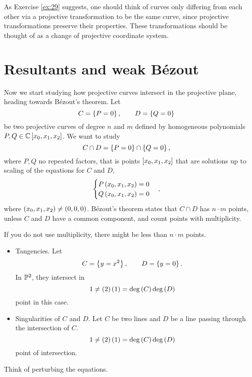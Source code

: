 \begin{remark}
As Exercise \ref{ex:29} suggests, one should think of curves only differing from each other via a projective transformation to be the same curve, since projective transformations preserve their properties. These transformations should be thought of as a change of projective coordinate system.
\end{remark}

\pagebreak

\section{Resultants and weak B\'ezout}


Now we start studying how projective curves intersect in the projective plane, heading towards B\'ezout's theorem. Let
$$ C = \cb{P = 0}, \qquad D = \cb{Q = 0} $$
be two projective curves of degree $ n $ and $ m $ defined by homogeneous polynomials $ P, Q \in \C\sb{x_0, x_1, x_2} $. We want to study
$$ C \cap D = \cb{P = 0} \cap \cb{Q = 0}, $$
where $ P, Q $ no repeated factors, that is points $ \sb{x_0, x_1, x_2} $ that are solutions up to scaling of the equations for $ C $ and $ D $,
$$
\begin{cases}
P\rb{x_0, x_1, x_2} = 0 \\
Q\rb{x_0, x_1, x_2} = 0
\end{cases},
$$
where $ \rb{x_0, x_1, x_2} \ne \rb{0, 0, 0} $. B\'ezout's theorem states that $ C \cap D $ has $ n \cdot m $ points, unless $ C $ and $ D $ have a common component, and count points with multiplicity.

\begin{example*}
If you do not use multiplicity, there might be less than $ n \cdot m $ points.
\begin{itemize}
\item Tangencies. Let
$$ C = \cb{y = x^2}, \qquad D = \cb{y = 0}. $$
In $ \P^2 $, they intersect in
$$ 1 \ne \rb{2}\rb{1} = \deg\rb{C}\deg\rb{D} $$
point in this case.
\item Singularities of $ C $ and $ D $. Let $ C $ be two lines and $ D $ be a line passing through the intersection of $ C $.
$$ 1 \ne \rb{2}\rb{1} = \deg\rb{C}\deg\rb{D} $$
point of intersection.
\end{itemize}
Think of perturbing the equations.
\end{example*}


